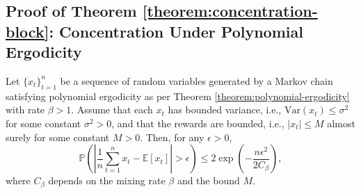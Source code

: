 \subsection{Proof of Theorem \ref{theorem:concentration-block}: Concentration Under Polynomial Ergodicity}
\label{app:proof-concentration-block}
\begin{theoremapp*}
Let \(\{x_t\}_{t=1}^n\) be a sequence of random variables generated by a Markov chain satisfying polynomial ergodicity as per Theorem \ref{theorem:polynomial-ergodicity} with rate \(\beta > 1\). Assume that each \(x_t\) has bounded variance, i.e., \(\text{Var}(x_t) \leq \sigma^2\) for some constant \(\sigma^2 > 0\), and that the rewards are bounded, i.e., \(|x_t| \leq M\) almost surely for some constant \(M > 0\). Then, for any \(\epsilon > 0\),
\[
\mathbb{P}\left(\left|\frac{1}{n}\sum_{t=1}^n x_t - \mathbb{E}[x_t]\right| > \epsilon\right) \leq 2\exp\left(-\frac{n\epsilon^2}{2C_\beta}\right),
\]
where \(C_\beta\) depends on the mixing rate \(\beta\) and the bound \(M\).
\end{theoremapp*}

